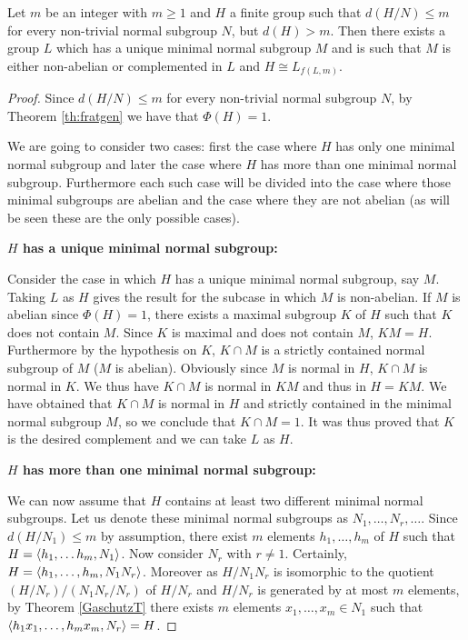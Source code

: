 \begin{theorem}
    Let $m$ be an integer with $m \ge 1$ and $H$ a finite group such that $d(H/N) \le m$ for every non-trivial normal subgroup $N$, but $d(H) > m$. Then there exists a group $L$ which has a unique minimal normal subgroup $M$ and is such that $M$ is either non-abelian or complemented in $L$ and $H \cong L_{f(L,m)}$.
\end{theorem}
\begin{proof}
    Since $d(H/N) \le m$ for every non-trivial normal subgroup $N$, by Theorem \ref{th:fratgen} we have that $\Phi(H) = 1$.
    
    We are going to consider two cases: first the case where $H$ has only one minimal normal subgroup and later the case where $H$ has more than one minimal normal subgroup. Furthermore each such case will be divided into the case where those minimal subgroups are abelian and the case where they are not abelian (as will be seen these are the only possible cases).

    \vspace{\baselineskip}
    \noindent
    \textbf{$H$ has a unique minimal normal subgroup:}
    \vspace{\baselineskip}

    Consider the case in which $H$ has a unique minimal normal subgroup, say $M$. 
    Taking $L$ as $H$ gives the result for the subcase in which $M$ is non-abelian.
    If $M$ is abelian since $\Phi(H) = 1$, there exists a maximal subgroup $K$ of $H$ such that $K$ does not contain $M$. 
    Since $K$ is maximal and does not contain $M$, $KM = H$. 
    Furthermore by the hypothesis on $K$, $K \cap M$ is a strictly contained normal subgroup of $M$ ($M$ is abelian). Obviously since $M$ is normal in $H$, $K \cap M$ is normal in $K$. We thus have $K \cap M$ is normal in $KM$ and thus in $H=KM$. We have obtained that $K \cap M$ is normal in $H$ and strictly contained in the minimal normal subgroup $M$, so we conclude that $K \cap M = 1$. It was thus proved that $K$ is the desired complement and we can take $L$ as $H$.   

    \vspace{\baselineskip}
    \noindent
    \textbf{$H$ has more than one minimal normal subgroup:}
    \vspace{\baselineskip}

    We can now assume that $H$ contains at least two different minimal normal subgroups. 
    Let us denote these minimal normal subgroups as $N_1, \ldots ,N_r, \ldots $. 
    Since $d(H/N_1) \le m$ by assumption, there exist $m$ elements $h_1,\ldots ,h_m$ of $H$ such that $H = \langle h_1,\ldots h_m, N_1 \rangle$. Now consider $N_r$ with $r \ne 1$. Certainly, $H = \langle h_1,\ldots ,h_m,N_1N_r \rangle$. Moreover as $H/N_1N_r$ is isomorphic to the quotient $(H/N_r)/(N_1N_r/N_r)$ of $H/N_r$ and $H/N_r$ is generated by at most $m$ elements, by Theorem \ref{GaschutzT} there exists $m$ elements $x_1,\ldots ,x_m \in N_1$ such that $\langle h_1x_1,\ldots ,h_mx_m,N_r \rangle = H$.


\end{proof}
